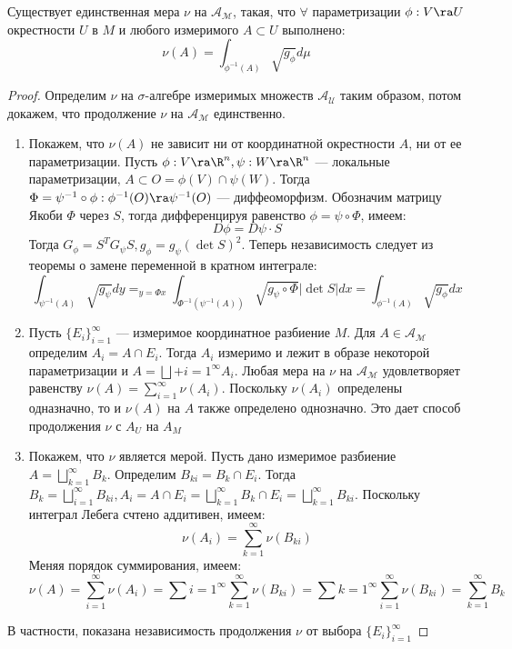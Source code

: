 
\begin{theorem}
    Существует единственная мера \(\nu\) на \(\mathcal{A_M}\), такая, что \(\forall\) параметризации \(\phi: V \ra U\) окрестности \(U\) в \(M\) и любого измеримого \(A \subset U\) выполнено:
    \[
        \nu(A) = \int_{\phi^{-1}(A)}\sqrt{g_\phi} d \mu
    \]
\end{theorem}
\begin{proof}
    Определим \(\nu\) на \(\sigma\)-алгебре измеримых множеств \(\mathcal{A_U}\) таким образом, потом докажем, что продолжение \(\nu\) на \(\mathcal{A_M}\) единственно.
    \begin{enumerate}
        \item Покажем, что \(\nu(A)\) не зависит ни от координатной окрестности \(A\), ни от ее параметризации. Пусть \(\phi: V \ra \R^n, \psi: W \ra \R^n\) --- локальные параметризации, \(A \subset O = \phi(V) \cap \psi(W)\). Тогда \(\Phi = \psi^{-1} \circ \phi: \phi^{-1}(O) \ra \psi^{-1}(O)\) --- диффеоморфизм. Обозначим матрицу Якоби \(\Phi\) через \(S\), тогда дифференцируя равенство \(\phi = \psi \circ \Phi\), имеем:
        \[D\phi = D\psi \cdot S\]
        Тогда \(G_\phi = S^TG_\psi S, g_\phi = g_\psi(\det S)^2\). Теперь независимость следует из теоремы о замене переменной в кратном интеграле:
        \[\int_{\psi^{-1}(A)}\sqrt{g_\psi}dy =_{y = \Phi x} \int_{\Phi^{-1}(\psi^{-1}(A))}\sqrt{g_\psi \circ \Phi}|\det S|dx = \int_{\phi^{-1}(A)}\sqrt{g_\phi}dx\]

        \item Пусть \(\{E_i\}_{i = 1}^\infty\) --- измеримое координатное разбиение \(M\). Для \(A \in \mathcal{A_M}\) определим \(A_i = A \cap E_i\). Тогда \(A_i\) измеримо и лежит в образе некоторой параметризации и \(A = \bigsqcup+{i = 1}^\infty A_i\). Любая мера на \(\nu\) на \(\mathcal{A_M}\) удовлетворяет равенству \(\nu(A) = \sum_{i = 1}^\infty \nu(A_i)\). Поскольку \(\nu(A_i)\) определены одназначно, то и \(\nu(A)\) на \(A\) также определено однозначно. Это дает способ продолжения \(\nu\) с \(A_U\) на \(A_M\)
        
        \item Покажем, что \(\nu\) является мерой. Пусть дано измеримое разбиение \(A = \bigsqcup_{k = 1}^\infty B_k\). Определим \(B_{ki} = B_k \cap E_i\). Тогда \(B_k = \bigsqcup_{i = 1}^\infty B_{ki}, A_i = A \cap E_i = \bigsqcup_{k = 1}^\infty B_k \cap E_i = \bigsqcup_{k = 1}^\infty B_{ki}\). Поскольку интеграл Лебега счтено аддитивен, имеем:
        \[\nu(A_i) = \sum_{k = 1}^\infty \nu(B_{ki})\]
        Меняя порядок суммирования, имеем:
        \[\nu(A) = \sum_{i = 1}^\infty \nu(A_i) = \sum{i = 1}^\infty \sum_{k = 1}^\infty \nu(B_{ki}) = \sum{k = 1}^\infty \sum_{i = 1}^\infty \nu(B_{ki}) = \sum_{k = 1}^\infty B_k\]
    \end{enumerate}
    В частности, показана независимость продолжения \(\nu\) от выбора \(\{E_i\}_{i = 1}^\infty\)
\end{proof}

